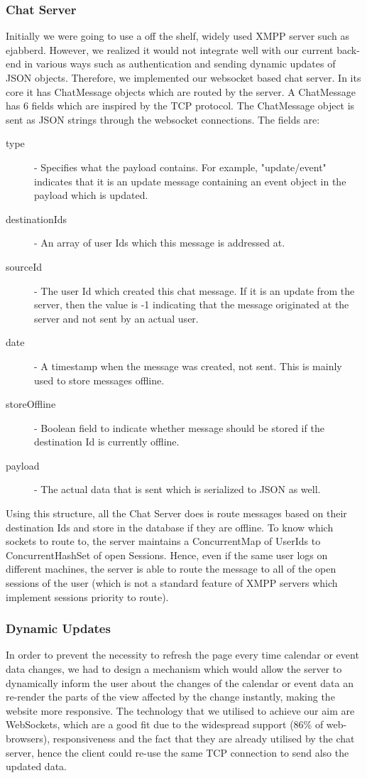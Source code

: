 \documentclass[10pt,a4paper]{article}
\begin{document}
\subsubsection{Chat Server}
Initially we were going to use a off the shelf, widely used XMPP server such as ejabberd. However, we realized it would not integrate well with our current back-end in various ways such as authentication and sending dynamic updates of JSON objects. Therefore, we implemented our websocket based chat server. In its core it has ChatMessage objects which are routed by the server. A ChatMessage has 6 fields which are inspired by the TCP protocol. The ChatMessage object is sent as JSON strings through the websocket connections. The fields are:
\begin{description}
\item[type] - Specifies what the payload contains. For example, "update/event" indicates that it is an update message containing an event object in the payload which is updated.
\item[destinationIds] - An array of user Ids which this message is addressed at.
\item[sourceId] - The user Id which created this chat message. If it is an update from the server, then the value is -1 indicating that the message originated at the server and not sent by an actual user.
\item[date] - A timestamp when the message was created, not sent. This is mainly used to store messages offline.
\item[storeOffline] - Boolean field to indicate whether message should be stored if the destination Id is currently offline.
\item[payload] - The actual data that is sent which is serialized to JSON as well.
\end{description}

Using this structure, all the Chat Server does is route messages based on their destination Ids and store in the database if they are offline. To know which sockets to route to, the server maintains a ConcurrentMap of UserIds to ConcurrentHashSet of open Sessions. Hence, even if the same user logs on different machines, the server is able to route the message to all of the open sessions of the user (which is not a standard feature of XMPP servers which implement sessions priority to route).

\subsubsection{Dynamic Updates}
In order to prevent the necessity to refresh the page every time calendar or event data changes, we had to design a mechanism which would allow the server to dynamically inform the user about the 
changes of the calendar or event data an re-render the parts of the view affected by the change instantly, making the website more responsive. The technology that we utilised to 
achieve our aim are WebSockets, which are a good fit due to the widespread support (86\% of web-browsers), responsiveness and the fact that they are already utilised by the chat server, hence
the client could re-use the same TCP connection to send also the updated data.
\end{document}
